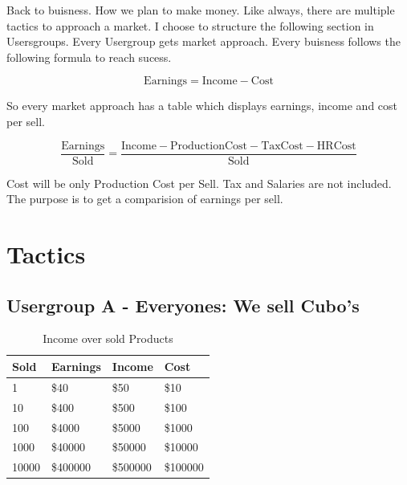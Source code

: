 \documentclass{report}
\begin{document}
Back to buisness. How we plan to make money.
Like always, there are multiple tactics to approach a market.
I choose to structure the following section in Usersgroups.
Every Usergroup gets market approach.
Every buisness follows the following formula to reach sucess.

\begin{equation}
	\text{Earnings} = \text{Income} - \text{Cost}
\end{equation}

So every market approach has a table which displays earnings, income and cost per sell.

\begin{equation}
	\frac{\text{Earnings}}{\text{Sold}} = \frac{\text{Income} - \text{ProductionCost} - \text{TaxCost} - \text{HRCost}}{\text{Sold}}
\end{equation}

Cost will be only Production Cost per Sell.
Tax and Salaries are not included. The purpose is to get a comparision of earnings per sell.

\newpage

\section{Tactics}

\subsection{Usergroup A - Everyones: We sell Cubo's}

\begin{table}[hbp]
	\centering
	\captionsetup{justification=raggedright}
	\caption{Income over sold Products}
	\label{tab:sales}
	\begin{tabular}{|p{2cm}|p{2cm}|p{2cm}|p{2cm}|}
		\hline
		\textbf{Sold} & \textbf{Earnings} & \textbf{Income} & \textbf{Cost} \\
		\hline
		1             & \$40              & \$50            & \$10          \\
		\hline
		10            & \$400             & \$500           & \$100         \\
		\hline
		100           & \$4000            & \$5000          & \$1000        \\
		\hline
		1000          & \$40000           & \$50000         & \$10000       \\
		\hline
		10000         & \$400000          & \$500000        & \$100000      \\
		\hline
	\end{tabular}
\end{table}
\end{document}
